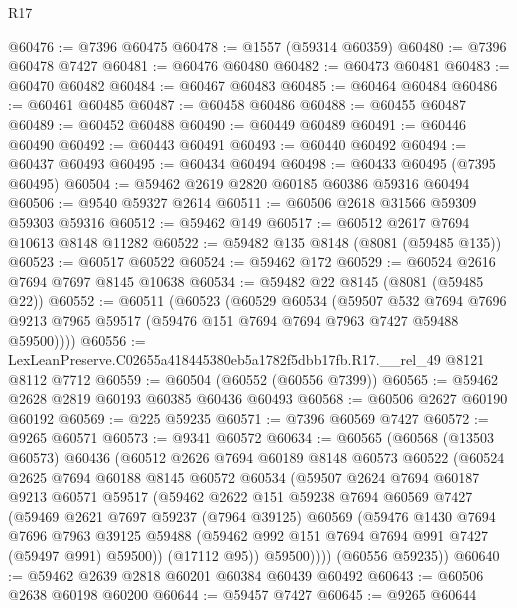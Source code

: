 \begin{lexlean}{R17}
\begin{coremodule}
@60476 := @7396 @60475
@60478 := @1557 (@59314 @60359)
@60480 := @7396 @60478 @7427
@60481 := @60476 @60480
@60482 := @60473 @60481
@60483 := @60470 @60482
@60484 := @60467 @60483
@60485 := @60464 @60484
@60486 := @60461 @60485
@60487 := @60458 @60486
@60488 := @60455 @60487
@60489 := @60452 @60488
@60490 := @60449 @60489
@60491 := @60446 @60490
@60492 := @60443 @60491
@60493 := @60440 @60492
@60494 := @60437 @60493
@60495 := @60434 @60494
@60498 := @60433 @60495 (@7395 @60495)
@60504 := @59462 @2619 @2820 @60185 @60386 @59316 @60494
@60506 := @9540 @59327 @2614
@60511 := @60506 @2618 @31566 @59309 @59303 @59316
@60512 := @59462 @149
@60517 := @60512 @2617 @7694 @10613 @8148 @11282
@60522 := @59482 @135 @8148 (@8081 (@59485 @135))
@60523 := @60517 @60522
@60524 := @59462 @172
@60529 := @60524 @2616 @7694 @7697 @8145 @10638
@60534 := @59482 @22 @8145 (@8081 (@59485 @22))
@60552 := @60511
    (@60523
      (@60529
        @60534
        (@59507
          @532
          @7694
          @7696
          @9213
          @7965
          @59517
          (@59476 @151 @7694 @7694 @7963 @7427 @59488 @59500))))
@60556 := LexLeanPreserve.C02655a418445380eb5a1782f5dbb17fb.R17.__rel_49 @8121 @8112 @7712
@60559 := @60504 (@60552 (@60556 @7399))
@60565 := @59462 @2628 @2819 @60193 @60385 @60436 @60493
@60568 := @60506 @2627 @60190 @60192
@60569 := @225 @59235
@60571 := @7396 @60569 @7427
@60572 := @9265 @60571
@60573 := @9341 @60572
@60634 := @60565
    (@60568
      (@13503 @60573)
      @60436
      (@60512
        @2626
        @7694
        @60189
        @8148
        @60573
        @60522
        (@60524
          @2625
          @7694
          @60188
          @8145
          @60572
          @60534
          (@59507
            @2624
            @7694
            @60187
            @9213
            @60571
            @59517
            (@59462
              @2622
              @151
              @59238
              @7694
              @60569
              @7427
              (@59469
                @2621
                @7697
                @59237
                (@7964 @39125)
                @60569
                (@59476
                  @1430
                  @7694
                  @7696
                  @7963
                  @39125
                  @59488
                  (@59462 @992 @151 @7694 @7694 @991 @7427 (@59497 @991) @59500))
                (@17112 @95))
              @59500))))
      (@60556 @59235))
@60640 := @59462 @2639 @2818 @60201 @60384 @60439 @60492
@60643 := @60506 @2638 @60198 @60200
@60644 := @59457 @7427
@60645 := @9265 @60644

\end{coremodule}
\end{lexlean}
